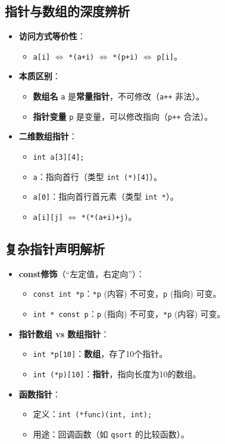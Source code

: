 \documentclass[a4paper,12pt]{article}
\begin{document}
\subsection{指针与数组的深度辨析}
\label{sec:pointer_array}
\begin{itemize}
    \item \textbf{访问方式等价性}：
    \begin{itemize}
        \item \texttt{a[i]} $\iff$ \texttt{*(a+i)} $\iff$ \texttt{*(p+i)} $\iff$ \texttt{p[i]}。
    \end{itemize}
    \item \textbf{本质区别}：
    \begin{itemize}
        \item \textbf{数组名} \texttt{a} 是\textbf{常量指针}，不可修改（\texttt{a++} 非法）。
        \item \textbf{指针变量} \texttt{p} 是变量，可以修改指向（\texttt{p++} 合法）。
    \end{itemize}
    \item \textbf{二维数组指针}：
    \begin{itemize}
        \item \texttt{int a[3][4];}
        \item \texttt{a}：指向首行（类型 \texttt{int (*)[4]}）。
        \item \texttt{a[0]}：指向首行首元素（类型 \texttt{int *}）。
        \item \texttt{a[i][j]} $\iff$ \texttt{*(*(a+i)+j)}。
    \end{itemize}
\end{itemize}

\subsection{复杂指针声明解析}
\label{sec:complex_pointers}
\begin{itemize}
    \item \textbf{const修饰}（“左定值，右定向”）：
    \begin{itemize}
        \item \texttt{const int *p}：\texttt{*p} (内容) 不可变，\texttt{p} (指向) 可变。
        \item \texttt{int * const p}：\texttt{p} (指向) 不可变，\texttt{*p} (内容) 可变。
    \end{itemize}
    \item \textbf{指针数组 vs 数组指针}：
    \begin{itemize}
        \item \texttt{int *p[10]}：\textbf{数组}，存了10个指针。
        \item \texttt{int (*p)[10]}：\textbf{指针}，指向长度为10的数组。
    \end{itemize}
    \item \textbf{函数指针}：
    \begin{itemize}
        \item 定义：\texttt{int (*func)(int, int);}
        \item 用途：回调函数（如 \texttt{qsort} 的比较函数）。
    \end{itemize}
\end{itemize}
\end{document}
